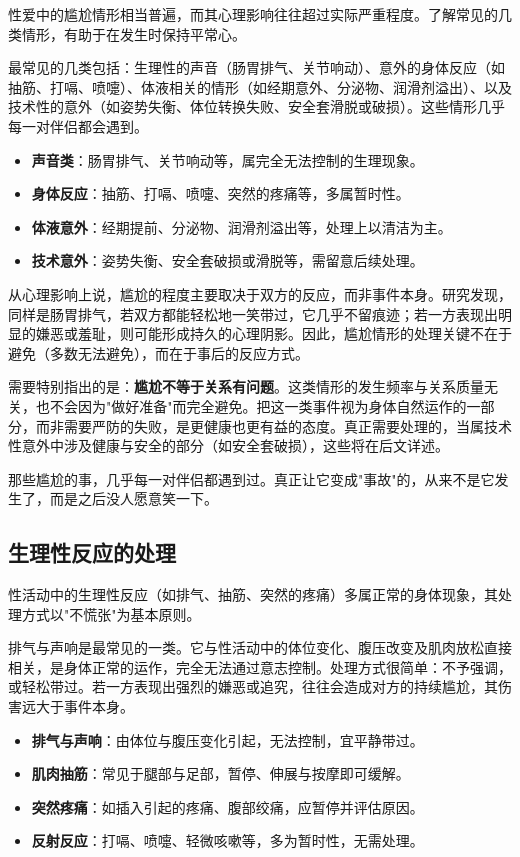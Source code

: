\documentclass[12pt,UTF8]{ctexbook}
\newcommand{\keyword}[1]{\textbf{#1}}
\begin{document}
性爱中的尴尬情形相当普遍，而其心理影响往往超过实际严重程度。了解常见的几类情形，有助于在发生时保持平常心。

最常见的几类包括：生理性的声音（肠胃排气、关节响动）、意外的身体反应（如抽筋、打嗝、喷嚏）、体液相关的情形（如经期意外、分泌物、润滑剂溢出）、以及技术性的意外（如姿势失衡、体位转换失败、安全套滑脱或破损）。这些情形几乎每一对伴侣都会遇到。

\begin{itemize}
  \item \keyword{声音类}：肠胃排气、关节响动等，属完全无法控制的生理现象。
  \item \keyword{身体反应}：抽筋、打嗝、喷嚏、突然的疼痛等，多属暂时性。
  \item \keyword{体液意外}：经期提前、分泌物、润滑剂溢出等，处理上以清洁为主。
  \item \keyword{技术意外}：姿势失衡、安全套破损或滑脱等，需留意后续处理。
\end{itemize}

从心理影响上说，尴尬的程度主要取决于双方的反应，而非事件本身。研究发现，同样是肠胃排气，若双方都能轻松地一笑带过，它几乎不留痕迹；若一方表现出明显的嫌恶或羞耻，则可能形成持久的心理阴影。因此，尴尬情形的处理关键不在于避免（多数无法避免），而在于事后的反应方式。

需要特别指出的是：\keyword{尴尬不等于关系有问题}。这类情形的发生频率与关系质量无关，也不会因为"做好准备"而完全避免。把这一类事件视为身体自然运作的一部分，而非需要严防的失败，是更健康也更有益的态度。真正需要处理的，当属技术性意外中涉及健康与安全的部分（如安全套破损），这些将在后文详述。

\begin{tcolorbox}[colback=pink!5!white,colframe=red!50!black,title=贴心小叮咛]
那些尴尬的事，几乎每一对伴侣都遇到过。真正让它变成"事故"的，从来不是它发生了，而是之后没人愿意笑一下。
\end{tcolorbox}
\subsection{生理性反应的处理}

性活动中的生理性反应（如排气、抽筋、突然的疼痛）多属正常的身体现象，其处理方式以"不慌张"为基本原则。

排气与声响是最常见的一类。它与性活动中的体位变化、腹压改变及肌肉放松直接相关，是身体正常的运作，完全无法通过意志控制。处理方式很简单：不予强调，或轻松带过。若一方表现出强烈的嫌恶或追究，往往会造成对方的持续尴尬，其伤害远大于事件本身。

\begin{itemize}
  \item \keyword{排气与声响}：由体位与腹压变化引起，无法控制，宜平静带过。
  \item \keyword{肌肉抽筋}：常见于腿部与足部，暂停、伸展与按摩即可缓解。
  \item \keyword{突然疼痛}：如插入引起的疼痛、腹部绞痛，应暂停并评估原因。
  \item \keyword{反射反应}：打嗝、喷嚏、轻微咳嗽等，多为暂时性，无需处理。
\end{itemize}
\end{document}

